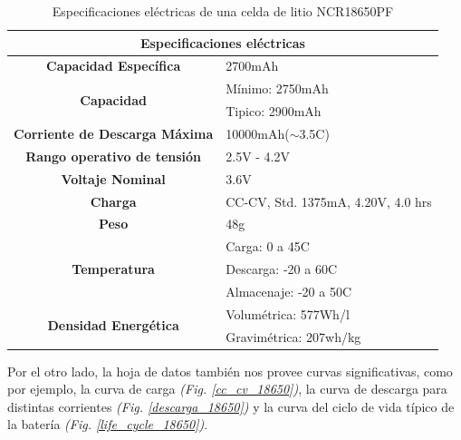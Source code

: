 \documentclass[10pt,a4paper]{article}
\begin{document}
\begin{table}[h]
    \begin{center}
	\begin{tabular}{|c|l|}
	    \hline
	    \multicolumn{2}{|c|}{Especificaciones el\'ectricas}                          \\ \hline
	    \textbf{Capacidad Específica}                 & 2700mAh                            \\ \hline
	    \multirow{2}{*}{\textbf{Capacidad}}           & Mínimo: 2750mAh                    \\ \cline{2-2} 
	    & Tipico: 2900mAh                    \\ \hline
	    \textbf{Corriente de Descarga Máxima}         & 10000mAh($\sim$3.5C)               \\ \hline
	    \textbf{Rango operativo de tensión}           & 2.5V - 4.2V                        \\ \hline
	    \textbf{Voltaje Nominal}                      & 3.6V                               \\ \hline
	    \textbf{Charga}                               & CC-CV, Std. 1375mA, 4.20V, 4.0 hrs \\ \hline
	    \textbf{Peso}                                 & 48g                              \\ \hline
	    \multirow{3}{*}{\textbf{Temperatura}}         & Carga: 0 a 45C                     \\ \cline{2-2} 
	    & Descarga: -20 a 60C                \\ \cline{2-2} 
	    & Almacenaje: -20 a 50C              \\ \hline
	    \multirow{2}{*}{\textbf{Densidad Energética}} & Volum\'etrica: 577Wh/l               \\ \cline{2-2} 
	    & Gravim\'etrica: 207wh/kg             \\ \hline
	\end{tabular}%
	\caption{Especificaciones el\'ectricas de una celda de litio NCR18650PF}
	\label{ncr_table}
    \end{center}
\end{table}

Por el otro lado, la hoja de datos también nos provee curvas significativas,
como por ejemplo, la curva de carga \emph{(Fig. \ref{cc_cv_18650})}, la curva de
descarga para distintas corrientes \emph{(Fig. \ref{descarga_18650})} y la curva
del ciclo de vida típico de la batería \emph{(Fig. \ref{life_cycle_18650})}.
\end{document}
